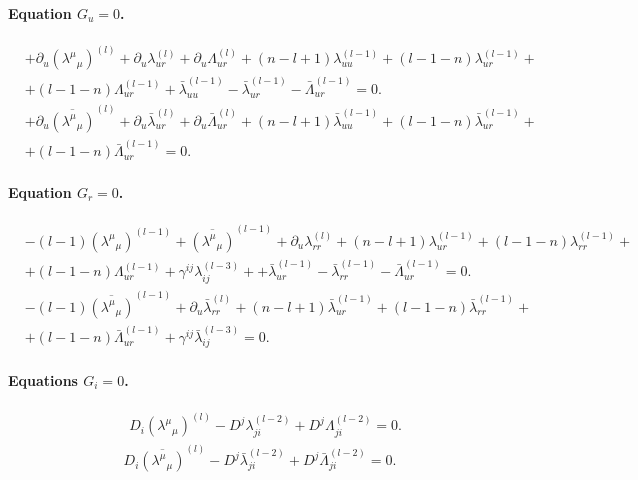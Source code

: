 \documentclass[a4paper,12pt]{article}
\begin{document}
\paragraph{Equation \(G_u=0\).}
\begin{align}
&
+\partial_u(\lambda^\mu{}_\mu)^{(l)}
+\partial_u\lambda_{ur}^{(l)}
+\partial_u\Lambda_{ur}^{(l)}
+(n-l+1)\lambda_{uu}^{(l-1)}
+(l-1-n)\lambda_{ur}^{(l-1)}+
\nonumber\\
&
+(l-1-n)\Lambda_{ur}^{(l-1)}
+\bar\lambda_{uu}^{(l-1)}
-\bar\lambda_{ur}^{(l-1)}
-\bar\Lambda_{ur}^{(l-1)}=0 .
\end{align}
\begin{align}
&
+\partial_u\overline{(\lambda^\mu{}_\mu)}^{(l)}
+\partial_u\bar\lambda_{ur}^{(l)}
+\partial_u\bar\Lambda_{ur}^{(l)}
+(n-l+1)\bar\lambda_{uu}^{(l-1)}
+(l-1-n)\bar\lambda_{ur}^{(l-1)}+
\nonumber\\
&
+(l-1-n)\bar\Lambda_{ur}^{(l-1)}=0 .
\end{align}

\paragraph{Equation \(G_r=0\).}
\begin{align}
&
-(l-1)(\lambda^\mu{}_\mu)^{(l-1)}
+\overline{(\lambda^\mu{}_\mu)}^{(l-1)}
+\partial_u\lambda_{rr}^{(l)}
+(n-l+1)\lambda_{ur}^{(l-1)}
+(l-1-n)\lambda_{rr}^{(l-1)}+
\nonumber\\
&
+(l-1-n)\Lambda_{ur}^{(l-1)}
+\gamma^{ij}\lambda_{ij}^{(l-3)}+
+\bar\lambda_{ur}^{(l-1)}
-\bar\lambda_{rr}^{(l-1)}
-\bar\Lambda_{ur}^{(l-1)}=0.
\end{align}
\begin{align}
&
-(l-1)\overline{(\lambda^\mu{}_\mu)}^{(l-1)}
+\partial_u\bar\lambda_{rr}^{(l)}
+(n-l+1)\bar\lambda_{ur}^{(l-1)}
+(l-1-n)\bar\lambda_{rr}^{(l-1)}+
\nonumber\\
&
+(l-1-n)\bar\Lambda_{ur}^{(l-1)}
+\gamma^{ij}\bar\lambda_{ij}^{(l-3)}=0 .
\end{align}

\paragraph{Equations \(G_i=0\).}
\begin{align}
&
D_i(\lambda^\mu{}_\mu)^{(l)}
- D^j\lambda_{ji}^{(l-2)}
+ D^j\Lambda_{ji}^{(l-2)}=0 .
\end{align}
\begin{align}
D_i\overline{(\lambda^\mu{}_\mu)}^{(l)}
- D^j\bar\lambda_{ji}^{(l-2)}
+ D^j\bar\Lambda_{ji}^{(l-2)}=0 .
\end{align}
\end{document}
